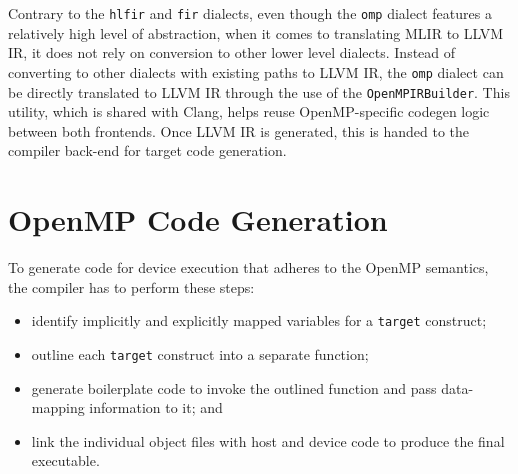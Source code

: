 \documentclass[acmtog,natbib=false]{acmart}
\newcommand{\code}[1]{\texttt{#1}\xspace}
\begin{document}
Contrary to the \code{hlfir} and \code{fir} dialects, even though the \code{omp} dialect features a relatively high level of abstraction, when it comes to translating \ac{MLIR} to LLVM \ac{IR}, it does not rely on conversion to other lower level dialects.
Instead of converting to other dialects with existing paths to LLVM \ac{IR}, the \code{omp} dialect can be directly translated to LLVM \ac{IR} through the use of the \code{OpenMPIRBuilder}.
This utility, which is shared with Clang, helps reuse OpenMP-specific codegen logic between both frontends.
Once LLVM \ac{IR} is generated, this is handed to the compiler back-end for target code generation.



\section{OpenMP Code Generation}
\label{sec:OpenMPCodeGen}

To generate code for device execution that adheres to the OpenMP semantics, the compiler has to perform these steps:

\begin{itemize}
\item identify implicitly and explicitly mapped variables for a \code{target} construct;
\item outline each \code{target} construct into a separate function;
\item generate boilerplate code to invoke the outlined function and pass data-mapping information to it; and
\item link the individual object files with host and device code to produce the final executable.
\end{itemize}
\end{document}
